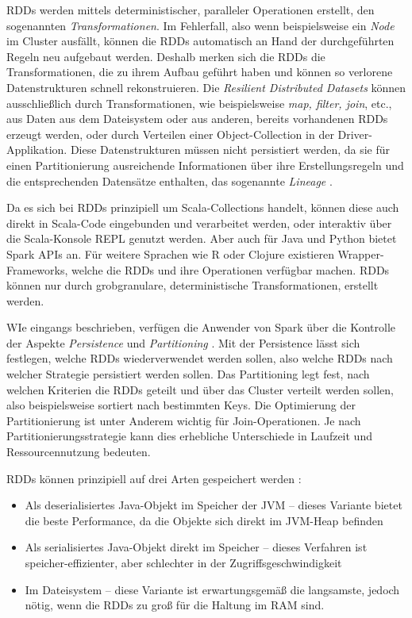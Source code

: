 RDDs werden mittels deterministischer, paralleler Operationen erstellt, den sogenannten \textit{Transformationen}. Im Fehlerfall, also wenn beispielsweise ein \textit{Node} im Cluster ausfällt, können die RDDs automatisch an Hand der durchgeführten Regeln neu aufgebaut werden. Deshalb merken sich die RDDs die Transformationen, die zu ihrem Aufbau geführt haben und können so verlorene Datenstrukturen schnell rekonstruieren. Die \textit{Resilient Distributed Datasets} können ausschließlich durch Transformationen, wie beispielsweise \textit{map, filter, join}, etc., aus Daten aus dem Dateisystem oder aus anderen, bereits vorhandenen RDDs erzeugt werden, oder durch Verteilen einer Object-Collection in der Driver-Applikation. Diese Datenstrukturen müssen nicht persistiert werden, da sie für einen Partitionierung ausreichende Informationen über ihre Erstellungsregeln und die entsprechenden Datensätze enthalten, das sogenannte \textit{Lineage} .   

Da es sich bei RDDs prinzipiell um Scala-Collections handelt, können diese auch direkt in Scala-Code eingebunden und verarbeitet werden, oder interaktiv über die Scala-Konsole REPL genutzt werden. Aber auch für Java und Python bietet Spark APIs an. Für weitere Sprachen wie R oder Clojure existieren Wrapper-Frameworks, welche die RDDs und ihre Operationen verfügbar machen.  RDDs können nur durch grobgranulare, deterministische Transformationen, erstellt werden.

WIe eingangs beschrieben, verfügen die Anwender von Spark über die Kontrolle der Aspekte \textit{Persistence} und \textit{Partitioning} . Mit der Persistence lässt sich festlegen, welche RDDs wiederverwendet werden sollen, also welche RDDs nach welcher Strategie persistiert werden sollen. Das Partitioning legt fest, nach welchen Kriterien die RDDs geteilt und über das Cluster verteilt werden sollen, also beispielsweise sortiert nach bestimmten Keys. Die Optimierung der Partitionierung ist unter Anderem wichtig für Join-Operationen. Je nach Partitionierungsstrategie kann dies erhebliche Unterschiede in Laufzeit und Ressourcennutzung bedeuten.  

RDDs können prinzipiell auf drei Arten gespeichert werden :
\begin{itemize}
		\item Als deserialisiertes Java-Objekt im Speicher der JVM – dieses Variante bietet die beste Performance, da die Objekte sich direkt im JVM-Heap befinden
		\item Als serialisiertes Java-Objekt direkt im Speicher – dieses Verfahren ist speicher-effizienter, aber schlechter in der Zugriffsgeschwindigkeit
		\item Im Dateisystem – diese Variante ist erwartungsgemäß die langsamste, jedoch nötig, wenn die RDDs zu groß für die Haltung im RAM sind. 		
\end{itemize}	


